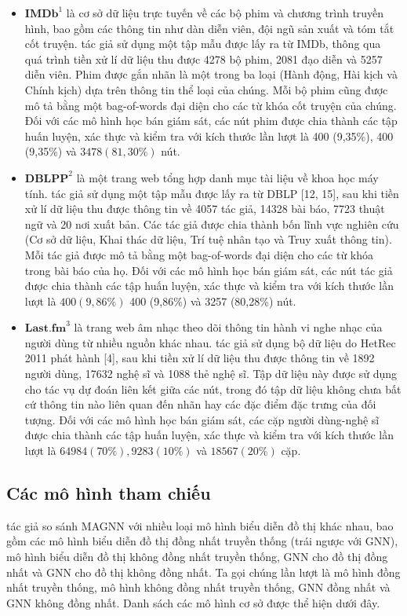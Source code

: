 \begin{itemize}
  \item $\mathbf{IMDb}^{1}$ là cơ sở dữ liệu trực tuyến về các bộ phim và chương trình truyền hình, bao gồm các thông tin như dàn diễn viên, đội ngũ sản xuất và tóm tắt cốt truyện. tác giả sử dụng một tập mẫu được lấy ra từ IMDb, thông qua quá trình tiền xử lí dữ liệu thu được 4278 bộ phim, 2081 đạo diễn và 5257 diễn viên. Phim được gắn nhãn là một trong ba loại (Hành động, Hài kịch và Chính kịch) dựa trên thông tin thể loại của chúng. Mỗi bộ phim cũng được mô tả bằng một bag-of-words đại diện cho các từ khóa cốt truyện của chúng. Đối với các mô hình học bán giám sát, các nút phim được chia thành các tập huấn luyện, xác thực và kiểm tra với kích thước lần lượt là 400 (9,35\%), 400 (9,35\%) và $3478(81,30 \%)$ nút.
  \item $\mathbf{DBLPP}^{2}$ là một trang web tổng hợp danh mục tài liệu về khoa học máy tính. tác giả sử dụng một tập mẫu được lấy ra từ DBLP [12, 15], sau khi tiền xử lí dữ liệu thu được thông tin về 4057 tác giả, 14328 bài báo, 7723 thuật ngữ và 20 nơi xuất bản. Các tác giả được chia thành bốn lĩnh vực nghiên cứu (Cơ sở dữ liệu, Khai thác dữ liệu, Trí tuệ nhân tạo và Truy xuất thông tin). Mỗi tác giả được mô tả bằng một bag-of-words đại diện cho các từ khóa trong bài báo của họ. Đối với các mô hình học bán giám sát, các nút tác giả được chia thành các tập huấn luyện, xác thực và kiểm tra với kích thước lần lượt là $400(9,86 \%)$ 400 (9,86\%) và 3257 (80,28\%) nút.
  \item $\mathbf{Last.fm}^{3}$ là trang web âm nhạc theo dõi thông tin hành vi nghe nhạc của người dùng từ nhiều nguồn khác nhau. tác giả sử dụng bộ dữ liệu do HetRec 2011 phát hành [4], sau khi tiền xử lí dữ liệu thu được thông tin về 1892 người dùng, 17632 nghệ sĩ và 1088 thẻ nghệ sĩ. Tập dữ liệu này được sử dụng cho tác vụ dự đoán liên kết giữa các nút, trong đó tập dữ liệu không chưa bất cứ thông tin nào liên quan đến nhãn hay các đặc điểm đặc trưng của đối tượng. Đối với các mô hình học bán giám sát, các cặp người dùng-nghệ sĩ được chia thành các tập huấn luyện, xác thực và kiểm tra với kích thước lần lượt là $64984(70 \%), 9283(10 \%)$ và $18567(20 \%)$ cặp.
\end{itemize}

\subsection{Các mô hình tham chiếu}
tác giả so sánh MAGNN với nhiều loại mô hình biểu diễn đồ thị khác nhau, bao gồm các mô hình biểu diễn đồ thị đồng nhất truyền thống (trái ngược với GNN), mô hình biểu diễn đồ thị không đồng nhất truyền thống, GNN cho đồ thị đồng nhất và GNN cho đồ thị không đồng nhất. Ta gọi chúng lần lượt là mô hình đồng nhất truyền thống, mô hình không đồng nhất truyền thống, GNN đồng nhất và GNN không đồng nhất. Danh sách các mô hình cơ sở được thể hiện dưới đây.

